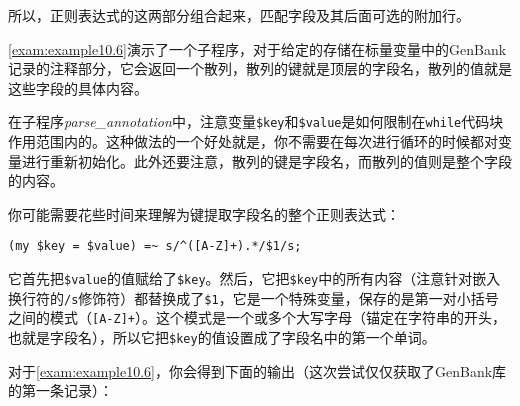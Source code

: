 所以，正则表达式的这两部分组合起来，匹配字段及其后面可选的附加行。

\autoref{exam:example10.6}演示了一个子程序，对于给定的存储在标量变量中的GenBank记录的注释部分，它会返回一个散列，散列的键就是顶层的字段名，散列的值就是这些字段的具体内容。



在子程序\textit{parse\_annotation}中，注意变量\verb|$key|和\verb|$value|是如何限制在\verb|while|代码块作用范围内的。这种做法的一个好处就是，你不需要在每次进行循环的时候都对变量进行重新初始化。此外还要注意，散列的键是字段名，而散列的值则是整个字段的内容。

你可能需要花些时间来理解为键提取字段名的整个正则表达式：

\begin{lstlisting}
(my $key = $value) =~ s/^([A-Z]+).*/$1/s;
\end{lstlisting}

它首先把\verb|$value|的值赋给了\verb|$key|。然后，它把\verb|$key|中的所有内容（注意针对嵌入换行符的\verb|/s|修饰符）都替换成了\verb|$1|，它是一个特殊变量，保存的是第一对小括号之间的模式（\verb|[A-Z]+|）。这个模式是一个或多个大写字母（锚定在字符串的开头，也就是字段名），所以它把\verb|$key|的值设置成了字段名中的第一个单词。


对于\autoref{exam:example10.6}，你会得到下面的输出（这次尝试仅仅获取了GenBank库的第一条记录）：

